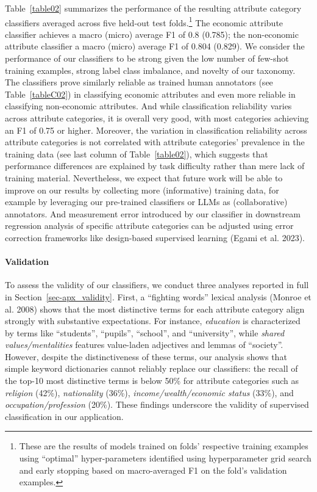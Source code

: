 \documentclass[12pt]{article}
\begin{document}
%

Table~\ref{table02} summarizes the performance of the resulting attribute category classifiers averaged across five held-out test folds.\footnote{These are the results of models trained on folds' respective training examples using ``optimal'' hyper-parameters identified using hyperparameter grid search and early stopping based on macro-averaged F1 on the fold's validation examples.
}
The economic attribute classifier achieves a macro (micro) average F1 of 0.8 (0.785); the non-economic attribute classifier a macro (micro) average F1 of 0.804 (0.829).
We consider the performance of our classifiers to be strong given the low number of few-shot training examples, strong label class imbalance, and novelty of our taxonomy.
The classifiers prove similarly reliable as trained human annotators (see Table~\ref{tableC02}) in classifying economic attributes and even more reliable in classifying non-economic attributes.
And while classification reliability varies across attribute categories, it is overall very good, with most categories achieving an F1 of 0.75 or higher.
Moreover, the variation in classification reliability across attribute categories is not correlated with attribute categories' prevalence in the training data (see last column of Table~\ref{table02}), which suggests that performance differences are explained by task difficulty rather than mere lack of training material.
Nevertheless, we expect that future work will be able to improve on our results by collecting more (informative) training data, for example by leveraging our pre-trained classifiers or LLMs as (collaborative) annotators.
And measurement error introduced by our classifier in downstream regression analysis of specific attribute categories can be adjusted using error correction frameworks like design-based supervised learning (Egami et al. 2023).

\paragraph{{Validation}}\label{validation}

To assess the validity of our classifiers, we conduct three analyses reported in full in Section~\ref{sec-apx_validity}.
First, a ``fighting words'' lexical analysis (Monroe et al. 2008) shows that the most distinctive terms for each attribute category align strongly with substantive expectations.
For instance, \emph{education} is characterized by terms like ``students'', ``pupils'', ``school'', and ``university'', while \emph{shared values/mentalities} features value-laden adjectives and lemmas of ``society''.
However, despite the distinctiveness of these terms, our analysis shows that simple keyword dictionaries cannot reliably replace our classifiers: the recall of the top-10 most distinctive terms is below 50\% for attribute categories such as \emph{religion} (42\%), \emph{nationality} (36\%), \emph{income/wealth/economic status} (33\%), and \emph{occupation/profession} (20\%).
These findings underscore the validity of supervised classification in our application.
\end{document}
